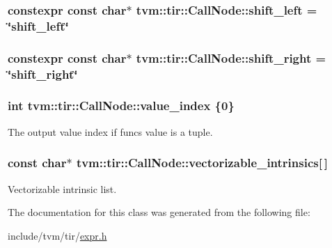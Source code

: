 \subsubsection[{\texorpdfstring{shift\+\_\+left}{shift_left}}]{\setlength{\rightskip}{0pt plus 5cm}constexpr const char$\ast$ tvm\+::tir\+::\+Call\+Node\+::shift\+\_\+left = \char`\"{}shift\+\_\+left\char`\"{}\hspace{0.3cm}{\ttfamily [static]}}\hypertarget{classtvm_1_1tir_1_1CallNode_a1a0078e5ee30ba236b8634e9aed8db24}{}\label{classtvm_1_1tir_1_1CallNode_a1a0078e5ee30ba236b8634e9aed8db24}
\subsubsection[{\texorpdfstring{shift\+\_\+right}{shift_right}}]{\setlength{\rightskip}{0pt plus 5cm}constexpr const char$\ast$ tvm\+::tir\+::\+Call\+Node\+::shift\+\_\+right = \char`\"{}shift\+\_\+right\char`\"{}\hspace{0.3cm}{\ttfamily [static]}}\hypertarget{classtvm_1_1tir_1_1CallNode_a4e768da713db6bcff8d7e6f51e4468e4}{}\label{classtvm_1_1tir_1_1CallNode_a4e768da713db6bcff8d7e6f51e4468e4}
\subsubsection[{\texorpdfstring{value\+\_\+index}{value_index}}]{\setlength{\rightskip}{0pt plus 5cm}int tvm\+::tir\+::\+Call\+Node\+::value\+\_\+index \{0\}}\hypertarget{classtvm_1_1tir_1_1CallNode_a399d6e07f8a5b8a9b15b8596fb548205}{}\label{classtvm_1_1tir_1_1CallNode_a399d6e07f8a5b8a9b15b8596fb548205}


The output value index if func\textquotesingle{}s value is a tuple. 

\subsubsection[{\texorpdfstring{vectorizable\+\_\+intrinsics}{vectorizable_intrinsics}}]{\setlength{\rightskip}{0pt plus 5cm}const char$\ast$ tvm\+::tir\+::\+Call\+Node\+::vectorizable\+\_\+intrinsics\mbox{[}$\,$\mbox{]}\hspace{0.3cm}{\ttfamily [static]}}\hypertarget{classtvm_1_1tir_1_1CallNode_a33a7c5928493a7206f3efc0e43c7fc88}{}\label{classtvm_1_1tir_1_1CallNode_a33a7c5928493a7206f3efc0e43c7fc88}


Vectorizable intrinsic list. 



The documentation for this class was generated from the following file\+:\begin{DoxyCompactItemize}
\item 
include/tvm/tir/\hyperlink{tir_2expr_8h}{expr.\+h}\end{DoxyCompactItemize}
